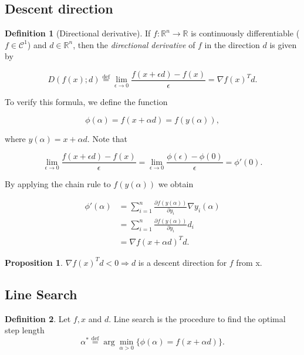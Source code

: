 \documentclass[a4paper, 10pt, twocolumn]{article}
\theoremstyle{definition}
\newtheorem*{defn}{Definition}
\newtheorem{prop}[theorem]{Proposition}
\theoremstyle{remark}
\newcommand{\al}{\alpha}
\newcommand{\R}{\mathbb{R}}
\newcommand{\C}{\mathcal{C}}
\begin{document}
\subsection{Descent direction}

\begin{defn} [Directional derivative]
If $f : \R^n \rightarrow \R$ is continuously differentiable ($f \in \C^1$) and $d \in \R^n$, then the \textit{directional derivative} of $f$ in the direction $d$ is given by

$$
D(f(x); d) \stackrel{\text{def}}{=} \lim_{\epsilon \rightarrow 0} \frac{f(x +\epsilon d) - f(x)}{\epsilon} = \nabla f(x)^T d.
$$

To verify this formula, we define the function

$$
\phi(\alpha) = f(x +\alpha d) = f(y(\alpha)), 
$$

where $y(\alpha) = x + \alpha d$. Note that

$$
\lim_{\epsilon \rightarrow 0} \frac{f(x +\epsilon d) - f(x)}{\epsilon} =
\lim_{\epsilon \rightarrow 0} \frac{\phi(\epsilon) - \phi(0)}{\epsilon} = 
\phi'(0).
$$

By applying the chain rule to $f(y(\alpha))$ we obtain

\begin{align*}
\phi'(\alpha) &= \sum_{i=1}^{n} \frac{\partial f(y(\alpha))}{\partial y_i}\nabla y_i(\alpha) \\
              &= \sum_{i=1}^{n} \frac{\partial f(y(\alpha))}{\partial y_i}d_i \\
              &= \nabla f(x + \alpha d)^Td.
\end{align*}
\end{defn}


\begin{prop}
$\nabla f(x)^Td < 0 \Rightarrow d$ is a descent direction for $f$ from x.
\end{prop}

\newpage


\subsection{Line Search}

\begin{defn}
Let $f, x$ and $d$. Line search is the procedure to find the optimal step length
$$
\al^* \stackrel{\text{def}}{=} \arg\min_{\al>0}\{\phi(\al) = f(x+\al d) \}.
$$
\end{defn}
\end{document}
